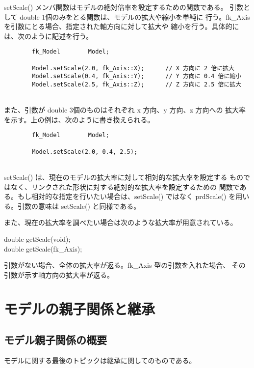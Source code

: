 setScale() メンバ関数はモデルの絶対倍率を設定するための関数である。
引数として double 1個のみをとる関数は、モデルの拡大や縮小を単純に
行う。fk\_Axis を引数にとる場合、指定された軸方向に対して拡大や
縮小を行う。具体的には、次のように記述を行う。
\\
\begin{breakbox}
\begin{verbatim}
        fk_Model        Model;

        Model.setScale(2.0, fk_Axis::X);      // X 方向に 2 倍に拡大
        Model.setScale(0.4, fk_Axis::Y);      // Y 方向に 0.4 倍に縮小
        Model.setScale(2.5, fk_Axis::Z);      // Z 方向に 2.5 倍に拡大
\end{verbatim}
\end{breakbox}
~ \\
また、引数が double 3個のものはそれぞれ x 方向、y 方向、z 方向への
拡大率を示す。上の例は、次のように書き換えられる。
\\
\begin{screen}
\begin{verbatim}
        fk_Model        Model;

        Model.setScale(2.0, 0.4, 2.5);
\end{verbatim}
\end{screen}
~ \\
setScale() は、現在のモデルの拡大率に対して相対的な拡大率を設定する
ものではなく、リンクされた形状に対する絶対的な拡大率を設定するための
関数である。もし相対的な指定を行いたい場合は、setScale() ではなく
prdScale() を用いる。引数の意味は setScale() と同様である。

また、現在の拡大率を調べたい場合は次のような拡大率が用意されている。

\begin{description}
\item[double getScale(void);]
\item[double getScale(fk\_Axis);]
\end{description}

引数がない場合、全体の拡大率が返る。fk\_Axis 型の引数を入れた場合、
その引数が示す軸方向の拡大率が返る。

\section{モデルの親子関係と継承}
\subsection{モデル親子関係の概要}
モデルに関する最後のトピックは継承に関してのものである。

